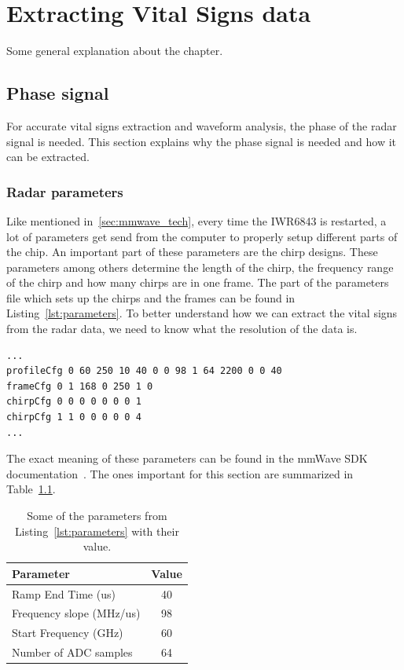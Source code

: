 \chapter{Extracting Vital Signs data}
\label{chp:measuring_vital_signs}
Some general explanation about the chapter.

\section{Phase signal}
For accurate vital signs extraction and waveform analysis, the phase of the radar signal is needed. This section explains why the phase signal is needed and how it can be extracted.

\subsection{Radar parameters}
Like mentioned in~\ref{sec:mmwave_tech}, every time the IWR6843 is restarted, a lot of parameters get send from the computer to properly setup different parts of the chip. An important part of these parameters are the chirp designs. These parameters among others determine the length of the chirp, the frequency range of the chirp and how many chirps are in one frame. The part of the parameters file which sets up the chirps and the frames can be found in Listing~\ref{lst:parameters}. To better understand how we can extract the vital signs from the radar data, we need to know what the resolution of the data is.

\begin{lstlisting}[label=lst:parameters, caption=Portion of the parameters file which gets send to the IWR6843 to set it up.]
...
profileCfg 0 60 250 10 40 0 0 98 1 64 2200 0 0 40
frameCfg 0 1 168 0 250 1 0
chirpCfg 0 0 0 0 0 0 0 1
chirpCfg 1 1 0 0 0 0 0 4
...
\end{lstlisting}

The exact meaning of these parameters can be found in the mmWave SDK documentation~\cite{mmwavesdk_website}. The ones important for this section are summarized in Table~\ref{tab:parameters}.

\begin{table}[t]
\centering
\begin{tabular}{|l|c|}
\hline
Parameter & Value \\ \hline
Ramp End Time (us) & 40 \\
Frequency slope (MHz/us) & 98 \\
Start Frequency (GHz) & 60 \\
Number of ADC samples & 64 \\ \hline
\end{tabular}
\caption{Some of the parameters from Listing~\ref{lst:parameters} with their value.}
\label{tab:parameters}
\end{table}

